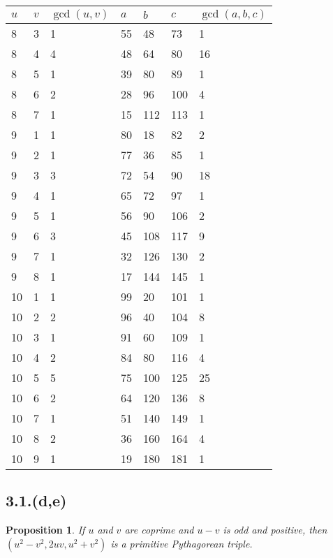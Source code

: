 \documentclass[letterpaper, 12pt]{memoir}
\theoremstyle{mystyle}
\newtheorem*{prop}{Proposition}
\begin{document}
\begin{tabular}{|l l l|l l l l|}
    \hline
    $u$ & $v$ & $\gcd (u, v)$  & $a$   & $b$   & $c$ & $\gcd(a,b,c)$  \\
    \hline
    8 & 3 & 1 & 55 & 48 & 73 & 1 \\
    8 & 4 & 4 & 48 & 64 & 80 & 16 \\
    8 & 5 & 1 & 39 & 80 & 89 & 1 \\
    8 & 6 & 2 & 28 & 96 & 100 & 4 \\
    8 & 7 & 1 & 15 & 112 & 113 & 1 \\
    9 & 1 & 1 & 80 & 18 & 82 & 2 \\
    9 & 2 & 1 & 77 & 36 & 85 & 1 \\
    9 & 3 & 3 & 72 & 54 & 90 & 18 \\
    9 & 4 & 1 & 65 & 72 & 97 & 1 \\
    9 & 5 & 1 & 56 & 90 & 106 & 2 \\
    9 & 6 & 3 & 45 & 108 & 117 & 9 \\
    9 & 7 & 1 & 32 & 126 & 130 & 2 \\
    9 & 8 & 1 & 17 & 144 & 145 & 1 \\
    10 & 1 & 1 & 99 & 20 & 101 & 1 \\
    10 & 2 & 2 & 96 & 40 & 104 & 8 \\
    10 & 3 & 1 & 91 & 60 & 109 & 1 \\
    10 & 4 & 2 & 84 & 80 & 116 & 4 \\
    10 & 5 & 5 & 75 & 100 & 125 & 25 \\
    10 & 6 & 2 & 64 & 120 & 136 & 8 \\
    10 & 7 & 1 & 51 & 140 & 149 & 1 \\
    10 & 8 & 2 & 36 & 160 & 164 & 4 \\
    10 & 9 & 1 & 19 & 180 & 181 & 1 \\
    \hline
\end{tabular}


\subsection*{3.1.(d,e)}
\begin{prop}
    If $u$ and $v$ are coprime and $u-v$ is odd and positive, then $(u^2-v^2,
    2uv, u^2+v^2)$ is a primitive Pythagorean triple.
\end{prop}
\end{document}

